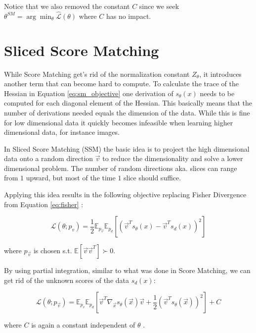 Notice that we also removed the constant $C$ since we seek $\theta^{SM} = \arg\min_{\theta} \hat{\mathcal{L}}(\theta)$ where $C$ has no impact.

\section{Sliced Score Matching}
\label{sec:ssm}

While Score Matching get's rid of the normalization constant $Z_\theta$, it introduces another term that can become hard
to compute. To calculate the trace of the Hessian in Equation \ref{eq:sm_objective} one derivation of $s_\theta(x)$ needs to be computed for each diagonal element of the Hessian.
This basically means that the number of derivations needed equals the dimension of the data. 
While this is fine for low dimensional data it quickly becomes infeasible when
learning higher dimensional data, for instance images.  

In Sliced Score Matching (SSM) \cite{ssm} the basic idea is to project the high dimensional data onto a random direction $\vec v$ to reduce 
the dimensionality and solve a lower dimensional problem. The number of random directions aka. slices can range from $1$ upward, but 
most of the time $1$ slice should suffice. 

Applying this idea results in the following objective replacing Fisher Divergence from Equation \ref{eq:fisher} \cite{ssm}: 

\begin{equation}
    \label{eq:ssm}
    \mathcal{L}(\theta; p_v) = \frac{1}{2} \mathbb{E}_{p_{\vec v}} \mathbb{E}_{p_d} \left[ \left( \vec{v}^T s_\theta(x) - \vec{v}^T s_d(x) \right)^2 \right]
\end{equation}

where $p_{\vec v}$ is chosen s.t. $\mathbb{E}\left[\vec v \vec v^T\right] \succ 0$.

By using partial integration, similar to what was done in Score Matching, we can get rid of the unknown scores of the data $s_d(x)$:

\begin{equation}
    \label{eq:ssm_final}
    \mathcal{L}(\theta; p_\vec{v}) = \mathbb{E}_{p_v} \mathbb{E}_{p_d} \left[ \vec{v}^T \nabla_\vec{x} s_\theta(\vec{x}) \vec{v} + \frac{1}{2} \left( \vec{v}^T s_\theta(\vec{x}) \right)^2 \right] + C
\end{equation}

where $C$ is again a constant independent of $\theta$ \cite{ssm}. 

